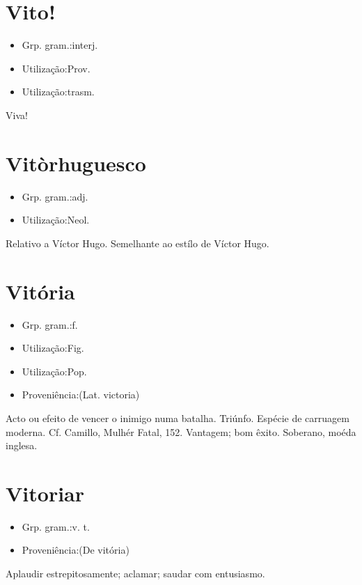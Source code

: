 \documentclass{article}
\begin{document}
\section{Vito!}
\begin{itemize}
\item {Grp. gram.:interj.}
\end{itemize}
\begin{itemize}
\item {Utilização:Prov.}
\end{itemize}
\begin{itemize}
\item {Utilização:trasm.}
\end{itemize}
Viva!
\section{Vitòrhuguesco}
\begin{itemize}
\item {Grp. gram.:adj.}
\end{itemize}
\begin{itemize}
\item {Utilização:Neol.}
\end{itemize}
Relativo a Víctor Hugo.
Semelhante ao estílo de Víctor Hugo.
\section{Vitória}
\begin{itemize}
\item {Grp. gram.:f.}
\end{itemize}
\begin{itemize}
\item {Utilização:Fig.}
\end{itemize}
\begin{itemize}
\item {Utilização:Pop.}
\end{itemize}
\begin{itemize}
\item {Proveniência:(Lat. \textunderscore victoria\textunderscore )}
\end{itemize}
Acto ou efeito de vencer o inimigo numa batalha.
Triúnfo.
Espécie de carruagem moderna. Cf. Camillo, \textunderscore Mulhér Fatal\textunderscore , 152.
Vantagem; bom êxito.
Soberano, moéda inglesa.
\section{Vitoriar}
\begin{itemize}
\item {Grp. gram.:v. t.}
\end{itemize}
\begin{itemize}
\item {Proveniência:(De \textunderscore vitória\textunderscore )}
\end{itemize}
Aplaudir estrepitosamente; aclamar; saudar com entusiasmo.
\end{document}
